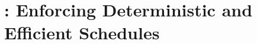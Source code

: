 
\newcommand{\bddbddb}{\v{bddbddb}\xspace}

\chapter{\peregrine: Enforcing Deterministic and Efficient Schedules} \label{sec:peregrine}












